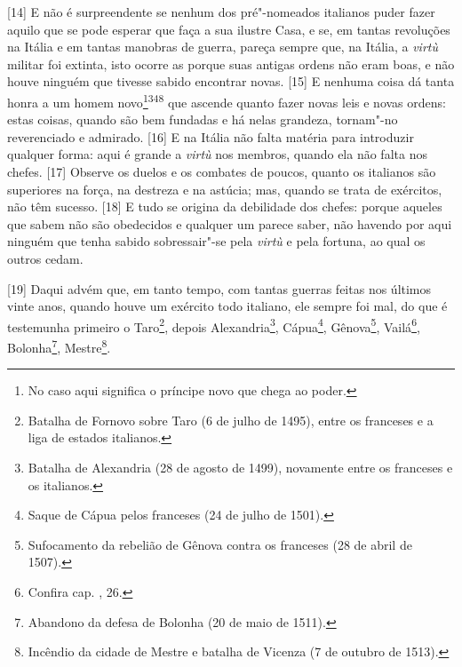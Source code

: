 {[}14{]} E não é surpreendente se nenhum dos pré"-nomeados italianos
puder fazer aquilo que se pode esperar que faça a sua ilustre Casa, e
se, em tantas revoluções na Itália e em tantas manobras de guerra,
pareça sempre que, na Itália, a \emph{virtù} militar foi extinta, isto
ocorre as porque suas antigas ordens não eram boas, e não houve ninguém
que tivesse sabido encontrar novas. {[}15{]} E nenhuma coisa dá tanta
honra a um homem novo\footnote{No caso aqui significa o príncipe novo
  que chega ao poder.}\textsuperscript{348} que ascende quanto fazer
novas leis e novas ordens: estas coisas, quando são bem fundadas e há
nelas grandeza, tornam"-no reverenciado e admirado. {[}16{]} E na Itália
não falta matéria para introduzir qualquer forma: aqui é grande a
\emph{virtù} nos membros, quando ela não falta nos chefes. {[}17{]}
Observe os duelos e os combates de poucos, quanto os italianos são
superiores na força, na destreza e na astúcia; mas, quando se trata de
exércitos, não têm sucesso. {[}18{]} E tudo se origina da debilidade dos
chefes: porque aqueles que sabem não são obedecidos e qualquer um parece
saber, não havendo por aqui ninguém que tenha sabido sobressair"-se pela
\emph{virtù} e pela fortuna, ao qual os outros cedam.

{[}19{]} Daqui advém que, em tanto tempo, com tantas guerras feitas nos
últimos vinte anos, quando houve um exército todo italiano, ele sempre
foi mal, do que é testemunha primeiro o Taro\footnote{Batalha de Fornovo
  sobre Taro (6 de julho de 1495), entre os franceses e a liga de
  estados italianos.}, depois Alexandria\footnote{Batalha de Alexandria
  (28 de agosto de 1499), novamente entre os franceses e os italianos.},
Cápua\footnote{Saque de Cápua pelos franceses (24 de julho de 1501).},
Gênova\footnote{Sufocamento da rebelião de Gênova contra os franceses
  (28 de abril de 1507).}, Vailá\footnote{Confira cap. , 26.},
Bolonha\footnote{Abandono da defesa de Bolonha (20 de maio de 1511).},
Mestre\footnote{Incêndio da cidade de Mestre e batalha de Vicenza (7 de
  outubro de 1513).}.

